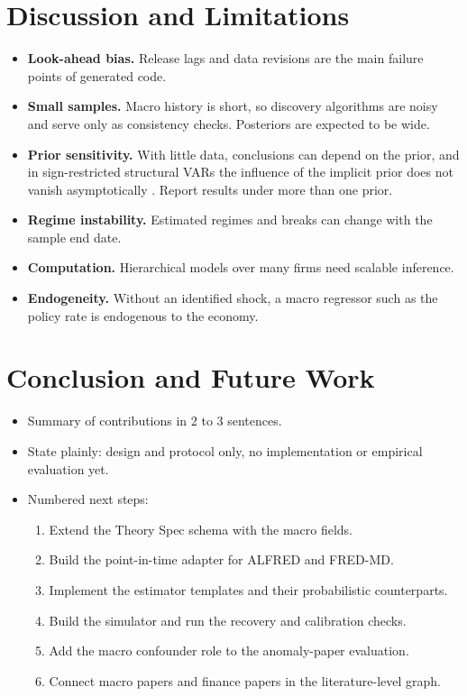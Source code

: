   \section{Discussion and Limitations}\label{sec:limitations}

  \begin{itemize}
  \tightlist
  \item
    \textbf{Look-ahead bias.} Release lags and data revisions are the main
    failure points of generated code.
  \item
    \textbf{Small samples.} Macro history is short, so discovery
    algorithms are noisy and serve only as consistency checks. Posteriors
    are expected to be wide.
  \item
    \textbf{Prior sensitivity.} With little data, conclusions can depend
    on the prior, and in sign-restricted structural VARs the influence of the
    implicit prior does not vanish asymptotically
    \cite{baumeister2015sign}. Report results under more than one prior.
  \item
    \textbf{Regime instability.} Estimated regimes and breaks can change
    with the sample end date.
  \item
    \textbf{Computation.} Hierarchical models over many firms need
    scalable inference.
  \item
    \textbf{Endogeneity.} Without an identified shock, a macro regressor
    such as the policy rate is endogenous to the economy.
  \end{itemize}

  \section{Conclusion and Future Work}\label{sec:conclusion}

  \begin{itemize}
  \tightlist
  \item
    Summary of contributions in 2 to 3 sentences.
  \item
    State plainly: design and protocol only, no implementation or
    empirical evaluation yet.
  \item
    Numbered next steps:

    \begin{enumerate}
    \def\labelenumi{\arabic{enumi}.}
    \tightlist
    \item
      Extend the Theory Spec schema with the macro fields.
    \item
      Build the point-in-time adapter for ALFRED and FRED-MD.
    \item
      Implement the estimator templates and their probabilistic
      counterparts.
    \item
      Build the simulator and run the recovery and calibration checks.
    \item
      Add the macro confounder role to the anomaly-paper evaluation.
    \item
      Connect macro papers and finance papers in the literature-level
      graph.
    \end{enumerate}
  \end{itemize}

  
  

